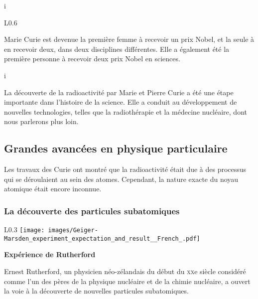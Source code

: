 \phantom i





\begin{wrapfigure}[11]{L}{0.6\textwidth}
\begin{fact}[title={Fait historique}]
Marie Curie est devenue la première femme à recevoir un prix Nobel, et la seule à en recevoir deux, dans deux disciplines différentes. Elle a également été la première personne à recevoir deux prix Nobel en sciences.
\end{fact}
\end{wrapfigure}

\phantom i

La découverte de la radioactivité par Marie et Pierre Curie a été une étape importante dans l'histoire de la science. Elle a conduit au développement de nouvelles technologies, telles que la radiothérapie et la médecine nucléaire, dont nous parlerons plus loin.

\subsection{Grandes avancées en physique particulaire}


Les travaux des Curie ont montré que la radioactivité était due à des processus qui se déroulaient au sein des atomes. Cependant, la nature exacte du noyau atomique était encore inconnue.


\subsubsection{La découverte des particules subatomiques}

\begin{wrapfigure}[10]{L}{0.3\textwidth}
    \texttt{[image: images/Geiger-Marsden\_experiment\_expectation\_and\_result\_\_French\_.pdf]}
    \begin{center}
        \bfseries Expérience de Rutherford
    \end{center}
\end{wrapfigure}

Ernest Rutherford, un physicien néo-zélandais du début du \textsc{xx}\up e siècle considéré comme l'un des pères de la physique nucléaire et de la chimie nucléaire, a ouvert la voie  à la découverte de nouvelles particules subatomiques. 



